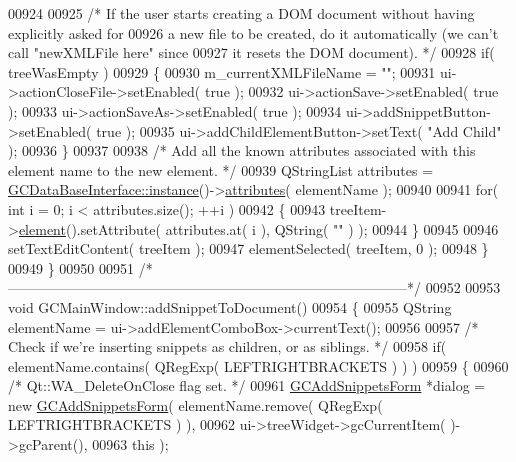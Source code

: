 \begin{DoxyCode}
{{{{{{00924 
00925     \textcolor{comment}{/* If the user starts creating a DOM document without having explicitly
       asked for}
00926 \textcolor{comment}{    a new file to be created, do it automatically (we can't call "newXMLFile
       here" since}
00927 \textcolor{comment}{    it resets the DOM document). */}
00928     \textcolor{keywordflow}{if}( treeWasEmpty )
00929     \{      
00930       m\_currentXMLFileName = \textcolor{stringliteral}{""};
00931       ui->actionCloseFile->setEnabled( \textcolor{keyword}{true} );
00932       ui->actionSave->setEnabled( \textcolor{keyword}{true} );
00933       ui->actionSaveAs->setEnabled( \textcolor{keyword}{true} );
00934       ui->addSnippetButton->setEnabled( \textcolor{keyword}{true} );
00935       ui->addChildElementButton->setText( \textcolor{stringliteral}{"Add Child"} );
00936     \}
00937 
00938     \textcolor{comment}{/* Add all the known attributes associated with this element name to the
       new element. */}
00939     QStringList attributes = \hyperlink{class_g_c_data_base_interface_a1baea9c0667aa8b610ec30076fcab84c}{GCDataBaseInterface::instance}()->\hyperlink{class_g_c_data_base_interface_afb1e49e08f98ca453f9ac66340a35642}{attributes}( 
      elementName );
00940 
00941     \textcolor{keywordflow}{for}( \textcolor{keywordtype}{int} i = 0; i < attributes.size(); ++i )
00942     \{
00943       treeItem->\hyperlink{class_g_c_tree_widget_item_a584cad866bdbd94710d31eb77b804d84}{element}().setAttribute( attributes.at( i ), QString( \textcolor{stringliteral}{""} ) );
00944     \}
00945 
00946     setTextEditContent( treeItem );
00947     elementSelected( treeItem, 0 );
00948   \}
00949 \}
00950 
00951 \textcolor{comment}{/*
      --------------------------------------------------------------------------------------*/}
00952 
00953 \textcolor{keywordtype}{void} GCMainWindow::addSnippetToDocument()
00954 \{
00955   QString elementName = ui->addElementComboBox->currentText();
00956 
00957   \textcolor{comment}{/* Check if we're inserting snippets as children, or as siblings. */}
00958   \textcolor{keywordflow}{if}( elementName.contains( QRegExp( LEFTRIGHTBRACKETS ) ) )
00959   \{
00960     \textcolor{comment}{/* Qt::WA\_DeleteOnClose flag set. */}
00961     \hyperlink{class_g_c_add_snippets_form}{GCAddSnippetsForm} *dialog = \textcolor{keyword}{new} \hyperlink{class_g_c_add_snippets_form}{GCAddSnippetsForm}( elementName.remove( 
      QRegExp( LEFTRIGHTBRACKETS ) ),
00962                                                  ui->treeWidget->gcCurrentItem(
      )->gcParent(),
00963                                                  this );
}}}}}}
\end{DoxyCode}
